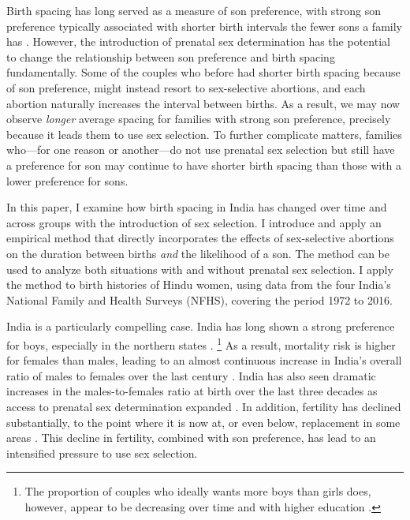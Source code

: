 Birth spacing has long served as a measure of son preference, with strong
son preference typically associated with shorter birth intervals the
fewer sons a family has \citep{ben-porath76b,Leung1988}.
However, the introduction of prenatal sex determination has the potential to 
change the relationship between son preference and birth spacing fundamentally.
Some of the couples who before had shorter birth spacing because of son preference,
might instead resort to sex-selective abortions, and each abortion naturally 
increases the interval between births.
As a result, we may now observe \emph{longer} average spacing for families with strong son 
preference, precisely because it leads them to use sex selection.
To further complicate matters, families who---for one reason or another---do 
not use prenatal sex selection but still have a preference for son may continue to have 
shorter birth spacing than those with a lower preference for sons.

In this paper, I examine how birth spacing in India has changed over time and across 
groups with the introduction of sex selection.
I introduce and apply an empirical method that directly incorporates the effects of 
sex-selective abortions on the duration between births 
\emph{and} 
the likelihood of a son. 
The method can be used to analyze both situations with and without prenatal
sex selection.
I apply the method to birth histories of Hindu women, using data from the four
India's National Family and Health Surveys (NFHS), covering the period 
1972 to 2016. 

India is a particularly compelling case.
India has long shown a strong preference for boys, especially in the northern 
states \citep{Kishor1993,murthi95,arnold98}.%
\footnote{
The proportion of couples who ideally wants more boys than girls does, however,
appear to be decreasing over time and with higher education \citep{bhat03,pande07}.
}
As a result, mortality risk is higher for females than males, leading to an almost
continuous increase in India's overall ratio of males to females over the last century 
\citep{dyson01,Navaneetham2011}.
India has also seen dramatic increases in the males-to-females ratio 
at birth over the last three decades as access to prenatal sex determination 
expanded \citep{das_gupta97,Sudha1999,Arnold2002,retherford03b,jha06}.
In addition, fertility has declined substantially, to the point where it is now
at, or even below, replacement in some areas 
\citep{Guilmoto2013,Dharmalingam2014,International-Institute-for-Population-Sciences-IIPS2017}.
This decline in fertility, combined with son preference, has lead to an intensified
pressure to use sex selection.
 

